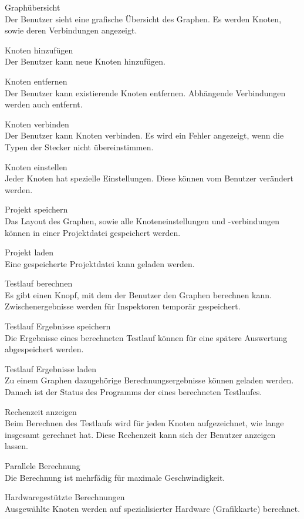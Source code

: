 \begin{speclist}[F]
\setcounter{specnum}{41010}

\spec Graphübersicht \\
Der Benutzer sieht eine grafische Übersicht des Graphen. Es werden Knoten, sowie deren Verbindungen angezeigt.

\spec Knoten hinzufügen \\
Der Benutzer kann neue Knoten hinzufügen.

\spec Knoten entfernen \\
Der Benutzer kann existierende Knoten entfernen. Abhängende Verbindungen werden auch entfernt.

\spec Knoten verbinden \\
Der Benutzer kann Knoten verbinden. Es wird ein Fehler angezeigt, wenn die Typen der Stecker nicht übereinstimmen.

\spec Knoten einstellen \\
Jeder Knoten hat spezielle Einstellungen. Diese können vom Benutzer verändert werden.

\spec Projekt speichern \\
Das Layout des Graphen, sowie alle Knoteneinstellungen und -verbindungen können in einer Projektdatei gespeichert werden.

\spec Projekt laden \\
Eine gespeicherte Projektdatei kann geladen werden.

\spec Testlauf berechnen \\
Es gibt einen Knopf, mit dem der Benutzer den Graphen berechnen kann. Zwischenergebnisse werden für Inspektoren temporär gespeichert.

\spec Testlauf Ergebnisse speichern \\
Die Ergebnisse eines berechneten Testlauf können für eine spätere Auswertung abgespeichert werden.

\spec Testlauf Ergebnisse laden \\
Zu einem Graphen dazugehörige Berechnungsergebnisse können geladen werden. Danach ist der Status des Programms der eines berechneten Testlaufes.

\spec Rechenzeit anzeigen \\
Beim Berechnen des Testlaufs wird für jeden Knoten aufgezeichnet, wie lange insgesamt gerechnet hat. Diese Rechenzeit kann sich der Benutzer anzeigen lassen.

\optspec Parallele Berechnung \\
Die Berechnung ist mehrfädig für maximale Geschwindigkeit.

\optspec Hardwaregestützte Berechnungen \\
Ausgewählte Knoten werden auf spezialisierter Hardware (Grafikkarte) berechnet.

\end{speclist}

